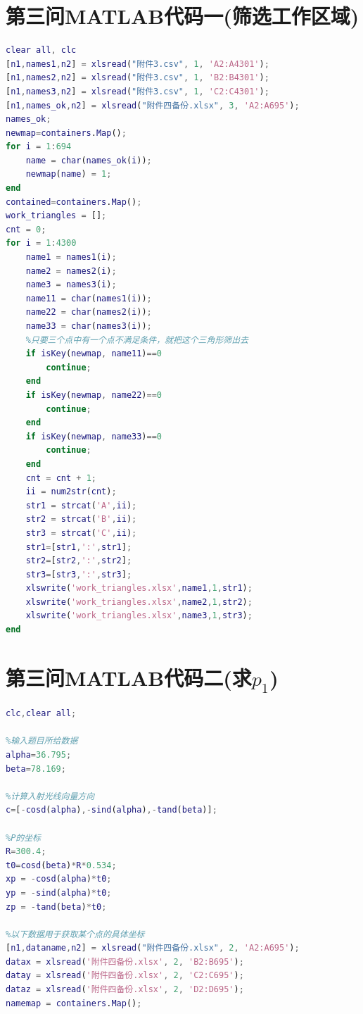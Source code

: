 \documentclass[withoutpreface,bwprint]{cumcmthesis} %
\begin{document}
\begin{appendices}
\begin{lstlisting}[language=matlab]
\end{lstlisting}
\section{第三问MATLAB代码一(筛选工作区域)}
\begin{lstlisting}[language=matlab]
clear all, clc
[n1,names1,n2] = xlsread("附件3.csv", 1, 'A2:A4301');
[n1,names2,n2] = xlsread("附件3.csv", 1, 'B2:B4301');
[n1,names3,n2] = xlsread("附件3.csv", 1, 'C2:C4301');
[n1,names_ok,n2] = xlsread("附件四备份.xlsx", 3, 'A2:A695');
names_ok;
newmap=containers.Map();												%	创建一个空的map对象
for i = 1:694
    name = char(names_ok(i));
    newmap(name) = 1;
end
contained=containers.Map();
work_triangles = [];
cnt = 0;
for i = 1:4300
    name1 = names1(i);
    name2 = names2(i);
    name3 = names3(i);
    name11 = char(names1(i));
    name22 = char(names2(i));
    name33 = char(names3(i));
    %只要三个点中有一个点不满足条件，就把这个三角形筛出去
    if isKey(newmap, name11)==0
        continue;
    end
    if isKey(newmap, name22)==0
        continue;
    end
    if isKey(newmap, name33)==0 
        continue;
    end
    cnt = cnt + 1;
    ii = num2str(cnt);
    str1 = strcat('A',ii);
    str2 = strcat('B',ii);
    str3 = strcat('C',ii);
    str1=[str1,':',str1];
    str2=[str2,':',str2];
    str3=[str3,':',str3];
    xlswrite('work_triangles.xlsx',name1,1,str1);
    xlswrite('work_triangles.xlsx',name2,1,str2);
    xlswrite('work_triangles.xlsx',name3,1,str3);
end

\end{lstlisting}
\section{第三问MATLAB代码二(求$p_1$)}
\begin{lstlisting}[language=matlab]
    clc,clear all;

%输入题目所给数据
alpha=36.795;
beta=78.169;

%计算入射光线向量方向
c=[-cosd(alpha),-sind(alpha),-tand(beta)];

%P的坐标
R=300.4;
t0=cosd(beta)*R*0.534;
xp = -cosd(alpha)*t0;
yp = -sind(alpha)*t0;
zp = -tand(beta)*t0;

%以下数据用于获取某个点的具体坐标
[n1,dataname,n2] = xlsread("附件四备份.xlsx", 2, 'A2:A695');
datax = xlsread('附件四备份.xlsx', 2, 'B2:B695');
datay = xlsread('附件四备份.xlsx', 2, 'C2:C695');
dataz = xlsread('附件四备份.xlsx', 2, 'D2:D695');
namemap = containers.Map();


\end{lstlisting}
\end{appendices}
\end{document}
